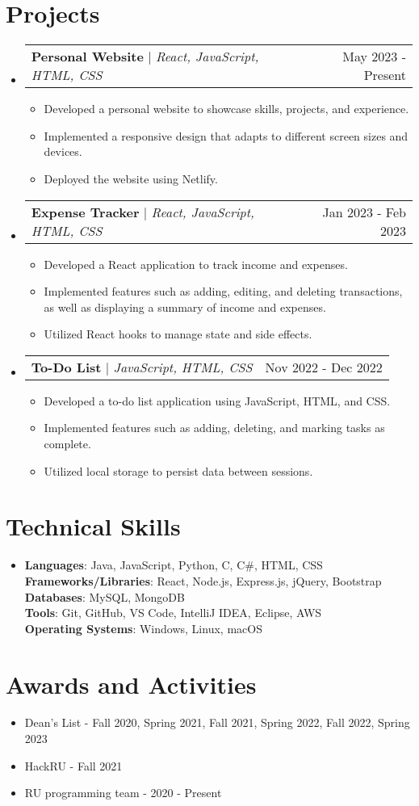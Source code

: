 \documentclass[letterpaper,11pt]{article}
\makeatletter
\newcommand{\resumeItem}[1]{
\item\small{
{#1 \vspace{-2pt}}
}
}
\newcommand{\resumeProjectHeading}[2]{
\item
\begin{tabular*}{0.97\textwidth}{l@{\extracolsep{\fill}}r}
\small#1 & #2 \\
\end{tabular*}\vspace{-7pt}
}
\newcommand{\resumeSubHeadingListStart}{\begin{itemize}[leftmargin=0.15in, label={}]}
\newcommand{\resumeSubHeadingListEnd}{\end{itemize}}
\newcommand{\resumeItemListStart}{\begin{itemize}}
\newcommand{\resumeItemListEnd}{\end{itemize}\vspace{-5pt}}
\makeatother
\begin{document}
\section{Projects}
\resumeSubHeadingListStart
\resumeProjectHeading{\textbf{Personal Website} $|$ \emph{React, JavaScript, HTML, CSS}}{May 2023 - Present}
\resumeItemListStart
\resumeItem{Developed a personal website to showcase skills, projects, and experience.}
\resumeItem{Implemented a responsive design that adapts to different screen sizes and devices.}
\resumeItem{Deployed the website using Netlify.}
\resumeItemListEnd

\resumeProjectHeading{\textbf{Expense Tracker} $|$ \emph{React, JavaScript, HTML, CSS}}{Jan 2023 - Feb 2023}
\resumeItemListStart
\resumeItem{Developed a React application to track income and expenses.}
\resumeItem{Implemented features such as adding, editing, and deleting transactions, as well as displaying a summary of income and expenses.}
\resumeItem{Utilized React hooks to manage state and side effects.}
\resumeItemListEnd

\resumeProjectHeading{\textbf{To-Do List} $|$ \emph{JavaScript, HTML, CSS}}{Nov 2022 - Dec 2022}
\resumeItemListStart
\resumeItem{Developed a to-do list application using JavaScript, HTML, and CSS.}
\resumeItem{Implemented features such as adding, deleting, and marking tasks as complete.}
\resumeItem{Utilized local storage to persist data between sessions.}
\resumeItemListEnd
\resumeSubHeadingListEnd

\section{Technical Skills}
\begin{itemize}[leftmargin=0.15in, label={}]
\item{\textbf{Languages}{: Java, JavaScript, Python, C, C\#, HTML, CSS} \\
\textbf{Frameworks/Libraries}{: React, Node.js, Express.js, jQuery, Bootstrap} \\
\textbf{Databases}{: MySQL, MongoDB} \\
\textbf{Tools}{: Git, GitHub, VS Code, IntelliJ IDEA, Eclipse, AWS} \\
\textbf{Operating Systems}{: Windows, Linux, macOS}}
\end{itemize}

\section{Awards and Activities}
\resumeSubHeadingListStart
\resumeItem{Dean's List - Fall 2020, Spring 2021, Fall 2021, Spring 2022, Fall 2022, Spring 2023}
\resumeItem{HackRU - Fall 2021}
\resumeItem{RU programming team - 2020 - Present}
\resumeSubHeadingListEnd
\end{document}
